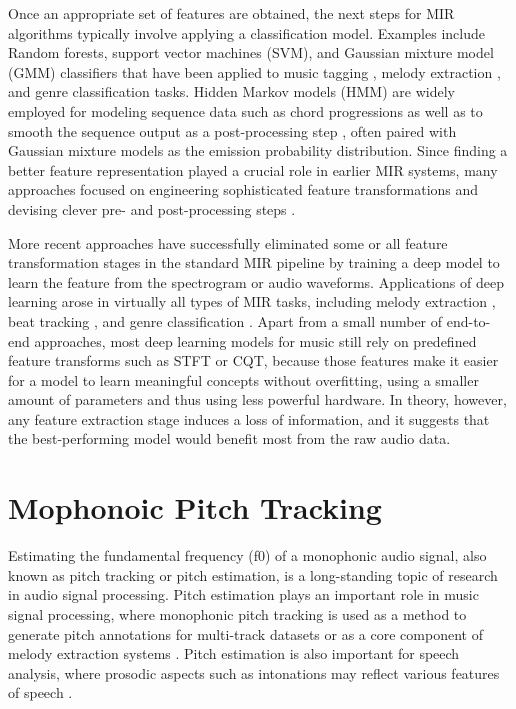 Once an appropriate set of features are obtained, the next steps for MIR algorithms typically involve applying a classification model.
Examples include Random forests, support vector machines (SVM), and Gaussian mixture model (GMM) classifiers that have been applied to music tagging \cite{ness2009tag}, melody extraction \cite{bittner2015contour}, and genre classification \cite{tzanetakis2002genre} tasks.
Hidden Markov models (HMM) are widely employed for modeling sequence data such as chord progressions \cite{cho2010chord} as well as to smooth the sequence output as a post-processing step \cite{khadkevich2009hmm}, often paired with Gaussian mixture models as the emission probability distribution.
Since finding a better feature representation played a crucial role in earlier MIR systems, many approaches focused on engineering sophisticated feature transformations \cite{harte2006tonnetz} and devising clever pre- and post-processing steps \cite{oudre2009chord}.


More recent approaches have successfully eliminated some or all feature transformation stages in the standard MIR pipeline by training a deep model to learn the feature from the spectrogram or audio waveforms.
Applications of deep learning arose in virtually all types of MIR tasks, including melody extraction \cite{bittner2017deepsalience}, beat tracking \cite{vogl2017drum}, and genre classification \cite{oramas2017genre}.
Apart from a small number of end-to-end approaches, most deep learning models for music still rely on predefined feature transforms such as STFT or CQT, because those features make it easier for a model to learn meaningful concepts without overfitting, using a smaller amount of parameters and thus using less powerful hardware.
In theory, however, any feature extraction stage induces a loss of information, and it suggests that the best-performing model would benefit most from the raw audio data.


\section{Mophonoic Pitch Tracking}

Estimating the fundamental frequency (f0) of a monophonic audio signal, also known as pitch tracking or pitch estimation, is a long-standing topic of research in audio signal processing.
Pitch estimation plays an important role in music signal processing, where monophonic pitch tracking is used as a method to generate pitch annotations for multi-track datasets \cite{bittner2014medleydb} or as a core component of melody extraction systems \cite{bosch2014melody, mauch2015computer}. 
Pitch estimation is also important for speech analysis, where prosodic aspects such as intonations may reflect various features of speech \cite{zubizarreta1998prosody}.

